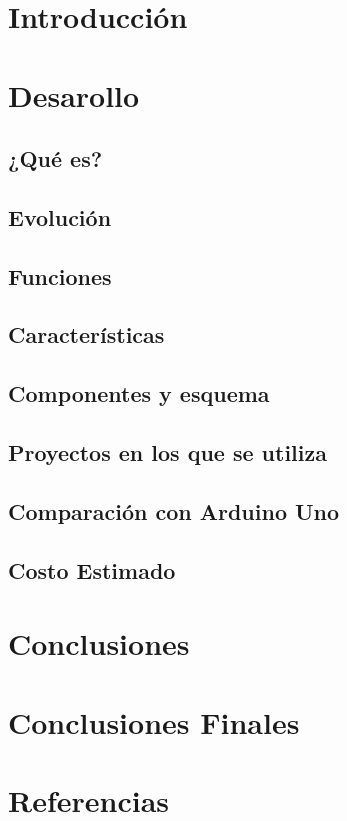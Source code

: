 \documentclass{extbook}
\begin{document}

\tableofcontents
\listoffigures
\listoftables %
\chapter{Introducción}

\chapter{Desarollo}
\section{¿Qué es?}

\section{Evolución}

\section{Funciones}

\section{Características}

\section{Componentes y esquema}

\section{Proyectos en los que se utiliza}

\section{Comparación con Arduino Uno}

\section{Costo Estimado}

\chapter{Conclusiones}

\chapter{Conclusiones Finales}

\chapter{Referencias}

\end{document}
